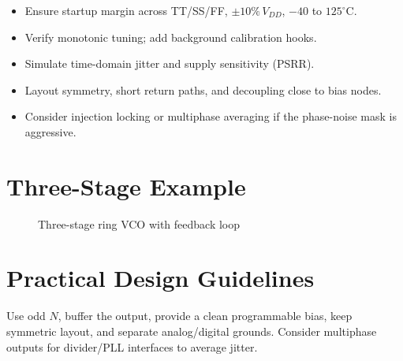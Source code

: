 \begin{itemize}
  \item Ensure startup margin across TT/SS/FF, $\pm10\%\,V_{DD}$, $-40$ to $125^\circ$C.
  \item Verify monotonic tuning; add background calibration hooks.
  \item Simulate time-domain jitter and supply sensitivity (PSRR).
  \item Layout symmetry, short return paths, and decoupling close to bias nodes.
  \item Consider injection locking or multiphase averaging if the phase-noise mask is aggressive.
\end{itemize}

\section{Three-Stage Example}
\begin{figure}[H]
  \centering
  \caption{Three-stage ring VCO with feedback loop}
\end{figure}

\section{Practical Design Guidelines}
Use odd \(N\), buffer the output, provide a clean programmable bias, keep symmetric layout, and separate analog/digital grounds. Consider multiphase outputs for divider/PLL interfaces to average jitter.


